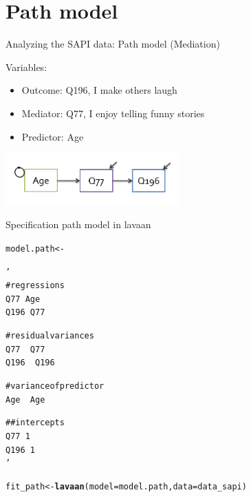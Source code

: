 \documentclass[10pt]{beamer}\usepackage[]{graphicx}\usepackage[]{xcolor}
\makeatletter
\newcommand{\hlstr}[1]{\textcolor[rgb]{0.192,0.494,0.8}{#1}}%
\newcommand{\hlstd}[1]{\textcolor[rgb]{0.345,0.345,0.345}{#1}}%
\newcommand{\hlkwb}[1]{\textcolor[rgb]{0.69,0.353,0.396}{#1}}%
\newcommand{\hlkwc}[1]{\textcolor[rgb]{0.333,0.667,0.333}{#1}}%
\newcommand{\hlkwd}[1]{\textcolor[rgb]{0.737,0.353,0.396}{\textbf{#1}}}%
\newenvironment{kframe}{%
 \def\at@end@of@kframe{}%
 \ifinner\ifhmode%
  \def\at@end@of@kframe{\end{minipage}}%
  \begin{minipage}{\columnwidth}%
 \fi\fi%
 \def\FrameCommand##1{\hskip\@totalleftmargin \hskip-\fboxsep
 \colorbox{shadecolor}{##1}\hskip-\fboxsep
     \hskip-\linewidth \hskip-\@totalleftmargin \hskip\columnwidth}%
 \MakeFramed {\advance\hsize-\width
   \@totalleftmargin\z@ \linewidth\hsize
   \@setminipage}}%
 {\par\unskip\endMakeFramed%
 \at@end@of@kframe}
\newenvironment{knitrout}{}{} %
\makeatother
\begin{document}
\section{Path model}
%
\begin{frame}{Analyzing the SAPI data: Path model (Mediation)}

Variables:
\begin{itemize}
\item{Outcome: Q196, I make others laugh}
\item{Mediator: Q77, I enjoy telling funny stories}
\item{Predictor: Age}
\end{itemize}

\vspace{5mm}

\includegraphics[height=2cm,keepaspectratio=T] {path_model.png}

\end{frame}
%
\begin{frame}[fragile]{Specification path model in lavaan}

\begin{knitrout}
\color{fgcolor}\begin{kframe}
\begin{alltt}
\hlstd{model.path} \hlkwb{<-} \hlstr{'
  # regressions
  Q77  ~ Age 
  Q196 ~ Q77 
  
  # residual variances
  Q77  ~~ Q77
  Q196 ~~ Q196
  
  # variance of predictor
  Age ~~ Age
  
  ## intercepts 
  Q77  ~ 1
  Q196 ~ 1
'}
\hlstd{fit_path} \hlkwb{<-} \hlkwd{lavaan}\hlstd{(}\hlkwc{model} \hlstd{= model.path,} \hlkwc{data} \hlstd{= data_sapi)}
\end{alltt}
\end{kframe}
\end{knitrout}

\end{frame}
%
\end{document}
